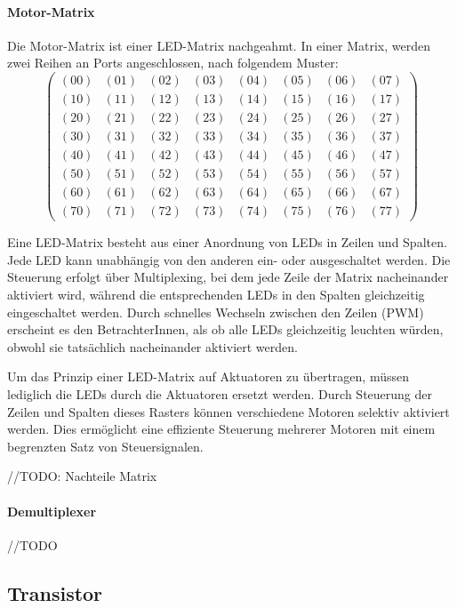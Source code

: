 \paragraph{Motor-Matrix}
Die Motor-Matrix ist einer LED-Matrix nachgeahmt.
In einer Matrix, werden zwei Reihen an Ports angeschlossen, nach folgendem Muster:
$$
\begin{pmatrix}
	(00) & (01) & (02) & (03) & (04) & (05) & (06) & (07) \\
	(10) & (11) & (12) & (13) & (14) & (15) & (16) & (17) \\
	(20) & (21) & (22) & (23) & (24) & (25) & (26) & (27) \\
	(30) & (31) & (32) & (33) & (34) & (35) & (36) & (37) \\
	(40) & (41) & (42) & (43) & (44) & (45) & (46) & (47) \\
	(50) & (51) & (52) & (53) & (54) & (55) & (56) & (57) \\
	(60) & (61) & (62) & (63) & (64) & (65) & (66) & (67) \\
	(70) & (71) & (72) & (73) & (74) & (75) & (76) & (77)
\end{pmatrix}
$$


Eine LED-Matrix besteht aus einer Anordnung von LEDs in Zeilen und Spalten. Jede LED kann unabhängig von den anderen
ein- oder ausgeschaltet werden. Die Steuerung erfolgt über Multiplexing, bei dem jede Zeile der Matrix nacheinander
aktiviert wird, während die entsprechenden LEDs in den Spalten gleichzeitig eingeschaltet werden. Durch schnelles
Wechseln zwischen den Zeilen (PWM) erscheint es den BetrachterInnen, als ob alle LEDs gleichzeitig leuchten würden,
obwohl sie tatsächlich nacheinander aktiviert werden. \newline

Um das Prinzip einer LED-Matrix auf Aktuatoren zu übertragen, müssen lediglich die LEDs durch die Aktuatoren ersetzt werden.
Durch Steuerung der Zeilen und Spalten dieses Rasters können verschiedene Motoren selektiv
aktiviert werden. Dies ermöglicht eine effiziente Steuerung mehrerer Motoren mit einem begrenzten Satz von
Steuersignalen. \newline

//TODO: Nachteile Matrix


\paragraph{Demultiplexer}
//TODO

\subsection{Transistor}

